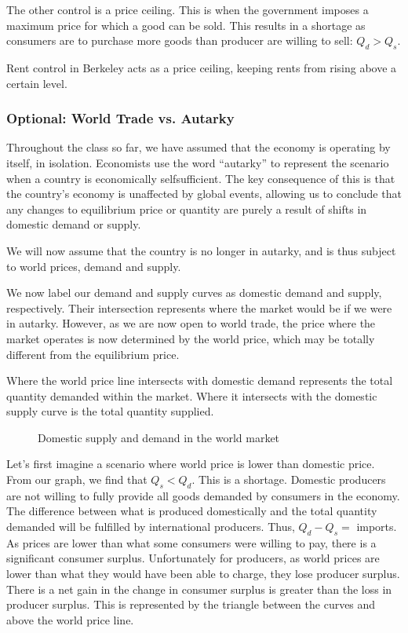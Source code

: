 \documentclass[letterpaper,10pt,english]{jupyterBook}
\let\sphinxpxdimen\pdfpxdimen\else\newdimen\sphinxpxdimen
\begin{document}
\sphinxAtStartPar
The other control is a price ceiling. This is when the government imposes a maximum price for which a good can be sold. This results in a shortage as consumers are to purchase more goods than producer are willing to sell: \(Q_d > Q_s\).

\sphinxAtStartPar
Rent control in Berkeley acts as a price ceiling, keeping rents from rising above a certain level.


\subsubsection{Optional: World Trade vs. Autarky}
\label{\detokenize{content/03-public/govt-intervention:optional-world-trade-vs-autarky}}
\sphinxAtStartPar
Throughout the class so far, we have assumed that the economy is operating by itself, in isolation. Economists use the word “autarky” to represent the scenario when a country is economically self\sphinxhyphen{}sufficient. The key consequence of this is that the country’s economy is unaffected by global events, allowing us to conclude that any changes to equilibrium price or quantity are purely a result of shifts in domestic demand or supply.

\sphinxAtStartPar
We will now assume that the country is no longer in autarky, and is thus subject to world prices, demand and supply.

\sphinxAtStartPar
We now label our demand and supply curves as domestic demand and supply, respectively. Their intersection represents where the market would be if we were in autarky. However, as we are now open to world trade, the price where the market operates is now determined by the world price, which may be totally different from the equilibrium price.

\sphinxAtStartPar
Where the world price line intersects with domestic demand represents the total quantity demanded within the market. Where it intersects with the domestic supply curve is the total quantity supplied.

\begin{figure}[htbp]
\centering
\capstart

\noindent\sphinxincludegraphics[width=500\sphinxpxdimen]{{fig8-autarky}.png}
\caption{Domestic supply and demand in the world market}\label{\detokenize{content/03-public/govt-intervention:autarky}}\end{figure}

\sphinxAtStartPar
Let’s first imagine a scenario where world price is lower than domestic price. From our graph, we find that \(Q_s < Q_d\). This is a shortage. Domestic producers are not willing to fully provide all goods demanded by consumers in the economy. The difference between what is produced domestically and the total quantity demanded will be fulfilled by international producers. Thus, \(Q_d - Q_s =\) imports. As prices are lower than what some consumers were willing to pay, there is a significant consumer surplus. Unfortunately for producers, as world prices are lower than what they would have been able to charge, they lose producer surplus. There is a net gain in the change in consumer surplus is greater than the loss in producer surplus. This is represented by the triangle between the curves and above the world price line.
\end{document}
